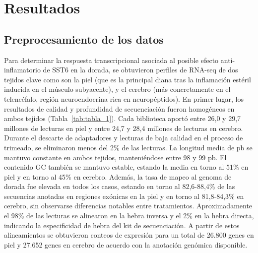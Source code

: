 \documentclass[10pt,a4paper]{article}
\begin{document}
\section{Resultados}
\subsection{Preprocesamiento de los datos}
Para determinar la respuesta transcripcional asociada al posible efecto anti-inflamatorio de SST6 en la dorada, se obtuvieron perfiles de RNA-seq de dos tejidos clave como son la piel (que es la principal diana tras la inflamación estéril inducida en el músculo subyacente), y el cerebro (más concretamente en el telencéfalo, región neuroendocrina rica en neuropéptidos). En primer lugar, los resultados de calidad y profundidad de secuenciación fueron homogéneos en ambos tejidos (Tabla~\ref{tab:tabla_1}). Cada biblioteca aportó entre 26,0 y 29,7 millones de lecturas en piel y entre 24,7 y 28,4 millones de lecturas en cerebro. Durante el descarte de adaptadores y lecturas de baja calidad en el proceso de trimeado, se eliminaron menos del 2\% de las lecturas. La longitud media de pb se mantuvo constante en ambos tejidos, manteniéndose entre 98 y 99 pb. El contenido GC también se mantuvo estable, estando la media en torno al 51\% en piel y en torno al 45\% en cerebro. Además, la tasa de mapeo al genoma de dorada fue elevada en todos los casos, estando en torno al 82,6-88,4\% de las secuencias anotadas en regiones exónicas en la piel y en torno al 81,8-84,3\% en cerebro, sin observarse diferencias notables entre tratamientos. Aproximadamente el 98\% de las lecturas se alinearon en la hebra inversa y el 2\% en la hebra directa, indicando la especificidad de hebra del kit de secuenciación. A partir de estos alineamientos se obtuvieron conteos de expresión para un total de 26.800 genes en piel y 27.652 genes en cerebro de acuerdo con la anotación genómica disponible.
\end{document}
